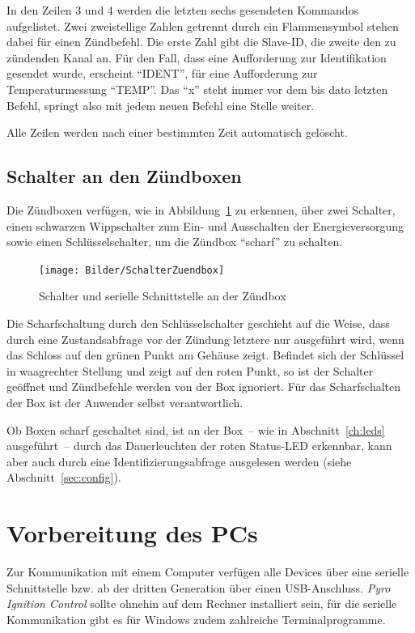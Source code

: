 \documentclass[paper=a4, parskip, numbers=noenddot, toc=listof, headsepline]{scrbook}
\newcommand{\pic}{\emph{Pyro Ignition Control}}
\begin{document}
			In den Zeilen 3 und 4 werden die letzten sechs gesendeten Kommandos aufgelistet. Zwei zweistellige Zahlen getrennt durch ein Flammensymbol stehen dabei für einen Zündbefehl. Die erste Zahl gibt die Slave-ID, die zweite den zu zündenden Kanal an. Für den Fall, dass eine Aufforderung zur Identifikation gesendet wurde, erscheint \enquote{IDENT}, für eine Aufforderung zur Temperaturmessung \enquote{TEMP}. Das \enquote{x} steht immer vor dem bis dato letzten Befehl, springt also mit jedem neuen Befehl eine Stelle weiter.

			Alle Zeilen werden nach einer bestimmten Zeit automatisch gelöscht.

		\section{Schalter an den Zündboxen}

			Die Zündboxen verfügen, wie in Abbildung~\ref{fig:schalterzuend} zu erkennen, über zwei Schalter, einen schwarzen Wippschalter zum Ein- und Ausschalten der Energieversorgung sowie einen Schlüsselschalter, um die Zündbox \enquote{scharf} zu schalten.

			\begin{figure}[!b]
				\centering
				\texttt{[image: Bilder/SchalterZuendbox]}
				\caption{Schalter und serielle Schnittstelle an der Zündbox}
				\label{fig:schalterzuend}
			\end{figure}

			Die Scharfschaltung durch den Schlüsselschalter geschieht auf die Weise, dass durch eine Zustandsabfrage vor der Zündung letztere nur ausgeführt wird, wenn das Schloss auf den grünen Punkt am Gehäuse zeigt. Befindet sich der Schlüssel in waagrechter Stellung und zeigt auf den roten Punkt, so ist der Schalter geöffnet und Zündbefehle werden von der Box ignoriert. Für das Scharfschalten der Box ist der Anwender selbst verantwortlich.

			Ob Boxen scharf geschaltet sind, ist an der Box~-- wie in Abschnitt~\ref{ch:leds} ausgeführt~-- durch das Dauerleuchten der roten Status-LED erkennbar, kann aber auch durch eine Identifizierungsabfrage ausgelesen werden (siehe Abschnitt~\ref{sec:config}).

	\chapter{Vorbereitung des PCs}

		Zur Kommunikation mit einem Computer verfügen alle Devices über eine serielle Schnittstelle bzw. ab der dritten Generation über einen USB-Anschluss. {\pic} sollte ohnehin auf dem Rechner installiert sein, für die serielle Kommunikation gibt es für Windows zudem zahlreiche Terminalprogramme.
\end{document}
